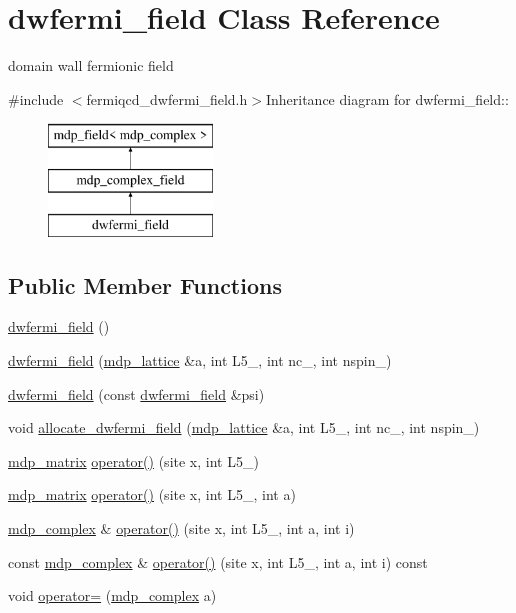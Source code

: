 \hypertarget{classdwfermi__field}{
\section{dwfermi\_\-field Class Reference}
\label{classdwfermi__field}
}


domain wall fermionic field  


{\ttfamily \#include $<$fermiqcd\_\-dwfermi\_\-field.h$>$}Inheritance diagram for dwfermi\_\-field::\begin{figure}[H]
\begin{center}
\leavevmode
\includegraphics[height=3cm]{classdwfermi__field}
\end{center}
\end{figure}
\subsection*{Public Member Functions}
\begin{DoxyCompactItemize}
\item 
\hyperlink{classdwfermi__field_a3463b5fdc91d928f765eb4ee35601672}{dwfermi\_\-field} ()
\item 
\hyperlink{classdwfermi__field_aea31f2beacd9fbf84b10488566a63982}{dwfermi\_\-field} (\hyperlink{classmdp__lattice}{mdp\_\-lattice} \&a, int L5\_\-, int nc\_\-, int nspin\_)
\item 
\hyperlink{classdwfermi__field_ae761300ce0a04ef58386ca3e58c7311c}{dwfermi\_\-field} (const \hyperlink{classdwfermi__field}{dwfermi\_\-field} \&psi)
\item 
void \hyperlink{classdwfermi__field_ab1e90f60aff705fd67fe54265511359c}{allocate\_\-dwfermi\_\-field} (\hyperlink{classmdp__lattice}{mdp\_\-lattice} \&a, int L5\_\-, int nc\_\-, int nspin\_)
\item 
\hyperlink{classmdp__matrix}{mdp\_\-matrix} \hyperlink{classdwfermi__field_a74ca9ee1a200f082bf816a306e0db58a}{operator()} (site x, int L5\_\-)
\item 
\hyperlink{classmdp__matrix}{mdp\_\-matrix} \hyperlink{classdwfermi__field_adca7e6c16994ace10946016d8d6de943}{operator()} (site x, int L5\_\-, int a)
\item 
\hyperlink{classmdp__complex}{mdp\_\-complex} \& \hyperlink{classdwfermi__field_ac0d1e75f5248ce12c06e7fcb8add5948}{operator()} (site x, int L5\_\-, int a, int i)
\item 
const \hyperlink{classmdp__complex}{mdp\_\-complex} \& \hyperlink{classdwfermi__field_a38dcacb8755165fdfcb41622912f1863}{operator()} (site x, int L5\_\-, int a, int i) const 
\item 
void \hyperlink{classdwfermi__field_a80684935337a1c336bd81379787ba9f4}{operator=} (\hyperlink{classmdp__complex}{mdp\_\-complex} a)
\end{DoxyCompactItemize}
